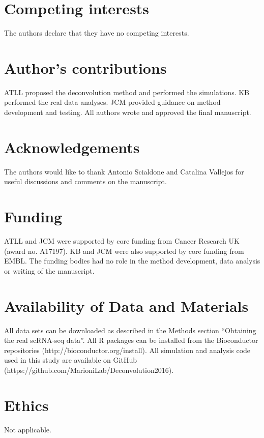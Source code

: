 \documentclass{bmcart}
\newcommand{\revised}[1]{#1}
\begin{document}

\begin{backmatter}

\section*{Competing interests}
The authors declare that they have no competing interests.

\section*{Author's contributions}
ATLL proposed the deconvolution method and performed the simulations.
KB performed the real data analyses.
JCM provided guidance on method development and testing.
All authors wrote and approved the final manuscript.

\section*{Acknowledgements}
The authors would like to thank Antonio Scialdone and Catalina Vallejos for useful discussions and comments on the manuscript.

\section*{Funding}
ATLL and JCM were supported by core funding from Cancer Research UK (award no. A17197).
KB and JCM were also supported by core funding from EMBL.
The funding bodies had no role in the method development, data analysis or writing of the manuscript.

\section*{Availability of Data and Materials}
\revised{All data sets can be downloaded as described in the Methods section ``Obtaining the real scRNA-seq data''.
All R packages can be installed from the Bioconductor repositories (http://bioconductor.org/install).
All simulation and analysis code used in this study are available on GitHub ({https://github.com/MarioniLab/Deconvolution2016}).}

\section*{Ethics}
Not applicable.


\end{backmatter}
\end{document}
